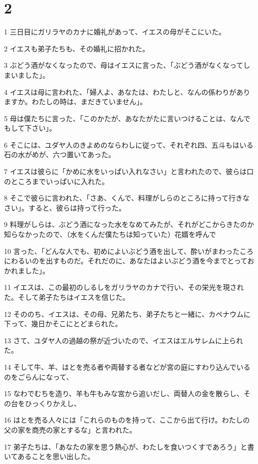 \chapter{2}

\par 1 三日目にガリラヤのカナに婚礼があって、イエスの母がそこにいた。
\par 2 イエスも弟子たちも、その婚礼に招かれた。
\par 3 ぶどう酒がなくなったので、母はイエスに言った、「ぶどう酒がなくなってしまいました」。
\par 4 イエスは母に言われた、「婦人よ、あなたは、わたしと、なんの係わりがありますか。わたしの時は、まだきていません」。
\par 5 母は僕たちに言った、「このかたが、あなたがたに言いつけることは、なんでもして下さい」。
\par 6 そこには、ユダヤ人のきよめのならわしに従って、それぞれ四、五斗もはいる石の水がめが、六つ置いてあった。
\par 7 イエスは彼らに「かめに水をいっぱい入れなさい」と言われたので、彼らは口のところまでいっぱいに入れた。
\par 8 そこで彼らに言われた、「さあ、くんで、料理がしらのところに持って行きなさい」。すると、彼らは持って行った。
\par 9 料理がしらは、ぶどう酒になった水をなめてみたが、それがどこからきたのか知らなかったので、（水をくんだ僕たちは知っていた）花婿を呼んで
\par 10 言った、「どんな人でも、初めによいぶどう酒を出して、酔いがまわったころにわるいのを出すものだ。それだのに、あなたはよいぶどう酒を今までとっておかれました」。
\par 11 イエスは、この最初のしるしをガリラヤのカナで行い、その栄光を現された。そして弟子たちはイエスを信じた。
\par 12 そののち、イエスは、その母、兄弟たち、弟子たちと一緒に、カペナウムに下って、幾日かそこにとどまられた。
\par 13 さて、ユダヤ人の過越の祭が近づいたので、イエスはエルサレムに上られた。
\par 14 そして牛、羊、はとを売る者や両替する者などが宮の庭にすわり込んでいるのをごらんになって、
\par 15 なわでむちを造り、羊も牛もみな宮から追いだし、両替人の金を散らし、その台をひっくりかえし、
\par 16 はとを売る人々には「これらのものを持って、ここから出て行け。わたしの父の家を商売の家とするな」と言われた。
\par 17 弟子たちは、「あなたの家を思う熱心が、わたしを食いつくすであろう」と書いてあることを思い出した。
